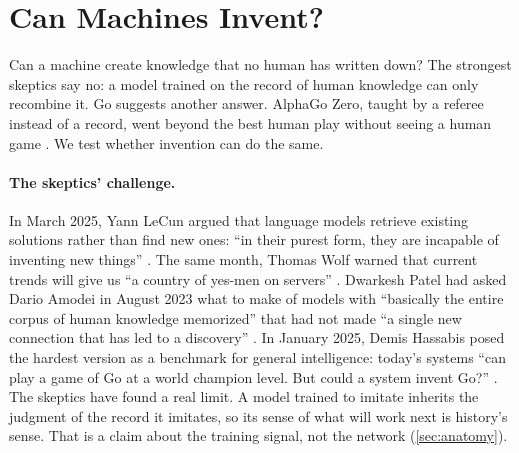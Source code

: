 
\section{Can Machines Invent?}\label{sec:intro}

Can a machine create knowledge that no human has written down? The strongest
skeptics say no: a model trained on the record of human knowledge can only
recombine it. Go suggests another answer. AlphaGo Zero, taught by a referee
instead of a record, went beyond the best human play without seeing a human
game \citep{silver2017mastering}. We test whether invention
can do the same.

\paragraph{The skeptics' challenge.}
In March 2025, Yann LeCun argued that language models retrieve existing
solutions rather than find new ones: ``in their purest form, they are incapable
of inventing new things'' \citep{lecun2025bigtech}. The same month, Thomas Wolf
warned that current trends will give us ``a country of yes-men on servers''
\citep{wolf2025einstein}. Dwarkesh Patel had asked Dario Amodei in August 2023
what to make of models with ``basically the entire corpus of human knowledge
memorized'' that had not made ``a single new connection that has led to a
discovery'' \citep{patel2023question}. In January 2025, Demis Hassabis posed
the hardest version as a benchmark for general intelligence: today's systems
``can play a game of Go at a world champion level. But could a system invent
Go?'' \citep{hassabis2025bigtech}. The skeptics have found a real limit. A
model trained to imitate inherits the judgment of the record it imitates, so
its sense of what will work next is history's sense. That is a claim about the
training signal, not the network (\cref{sec:anatomy}).


